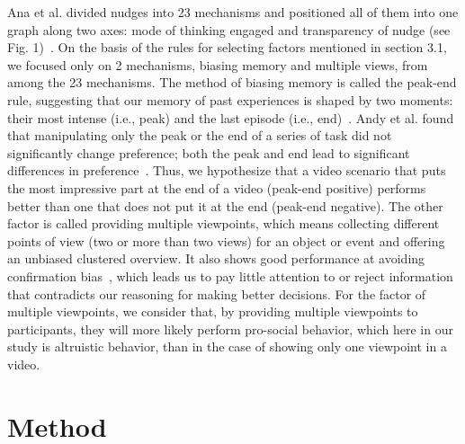 \documentclass[runningheads]{llncs}
\begin{document}
Ana et al. divided nudges into 23 mechanisms and positioned all of them into one graph along two axes: mode of thinking engaged and transparency of nudge (see Fig. 1)~\cite{ref_article5}. On the basis of the rules for selecting factors mentioned in section 3.1, we focused only on 2 mechanisms, biasing memory and multiple views, from among the 23 mechanisms. The method of biasing memory is called the peak-end rule, suggesting that our memory of past experiences is shaped by two moments: their most intense (i.e., peak) and the last episode (i.e., end)~\cite{ref_article15}. Andy et al. found that manipulating only the peak or the end of a series of task did not significantly change preference; both the peak and end lead to significant differences in preference~\cite{ref_article6}. Thus, we hypothesize that a video scenario that puts the most impressive part at the end of a video (peak-end positive) performs better than one that does not put it at the end (peak-end negative). The other factor is called providing multiple viewpoints, which means collecting different points of view (two or more than two views) for an object or event and offering an unbiased clustered overview. It also shows good performance at avoiding confirmation bias~\cite{ref_article7}, which leads us to pay little attention to or reject information that contradicts our reasoning for making better decisions. For the factor of multiple viewpoints, we consider that, by providing multiple viewpoints to participants, they will more likely perform pro-social behavior, which here in our study is altruistic behavior, than in the case of showing only one viewpoint in a video.






\section{Method}
\end{document}
